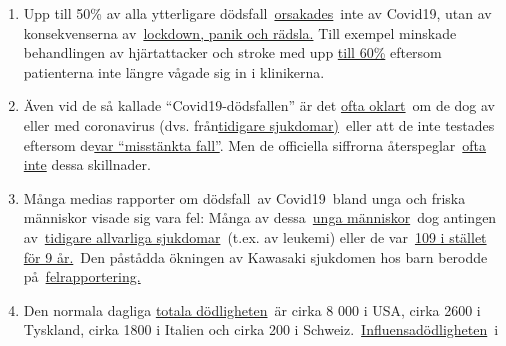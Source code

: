 \begin{enumerate}
{  klart}~om dessa människor verkligen dog från Covid19 eller av höga
  nivåer av stress, rädsla
  och~\href{http://pflegeethik-initiative.de/2020/04/15/corona-krise-falsche-prioritaeten-gesetzt-und-ethische-prinzipien-verletzt/}{ensamhet.}
\item
  Upp till 50\% av alla ytterligare
  dödsfall~\href{https://www.thetimes.co.uk/edition/news/coronavirus-record-weekly-death-toll-as-fearful-patients-avoid-hospitals-bm73s2tw3}{orsakades}~inte
  av Covid19, utan av konsekvenserna
  av~\href{https://www.telegraph.co.uk/global-health/science-and-disease/two-new-waves-deaths-break-nhs-new-analysis-warns/}{lockdown,
  panik och rädsla.} Till exempel minskade behandlingen av hjärtattacker
  och stroke med upp
  \href{https://www.nytimes.com/2020/04/06/well/live/coronavirus-doctors-hospitals-emergency-care-heart-attack-stroke.html}{till
  60\%} eftersom patienterna inte längre vågade sig in i klinikerna.
\item
  Även vid de så kallade ``Covid19-dödsfallen'' är det
  \href{https://spectator.us/understand-report-figures-covid-deaths/}{ofta
  oklart}~om de dog av eller med coronavirus (dvs.
  från\href{https://www.morgenpost.de/vermischtes/article228994571/Rechtsmediziner-Alle-Corona-Toten-hatten-Vorerkrankungen.html}{tidigare
  sjukdomar)}~eller att de inte testades eftersom
  de\href{https://www.youtube.com/watch?v=V0lIWZpiRU0}{var ``misstänkta
  fall''}. Men de officiella siffrorna
  återspeglar~\href{https://swprs.org/rki-relativiert-corona-todesfaelle/}{ofta
  inte} dessa skillnader.
\item
  Många medias rapporter om dödsfall~av Covid19~bland unga och friska
  människor visade sig vara fel: Många av
  dessa~\href{https://www.dailymail.co.uk/news/article-8193487/Coroner-refuses-rule-COVID-19-cause-death-six-week-old-Connecticut-baby.html}{unga
  människor}~dog antingen
  av~\href{https://www.msn.com/de-ch/news/other/spanischer-nachwuchs-trainer-stirbt-an-corona/ar-BB11gT64}{tidigare
  allvarliga sjukdomar}~(t.ex. av leukemi) eller de
  var~\href{https://www.n-tv.de/panorama/Neunjaehrige-Corona-Tote-war-109-Jahre-alt-article21753784.html}{109
  i stället för 9 år.}~Den påstådda ökningen av Kawasaki sjukdomen hos
  barn berodde
  på~\href{https://www.societi.org.uk/kawasaki-disease-and-covid-19/}{felrapportering.}
\item
  Den normala dagliga
  \href{https://www.cdc.gov/mmwr/volumes/68/wr/mm6826a5.htm}{totala
  dödligheten}~är cirka 8 000 i USA, cirka 2600 i Tyskland, cirka 1800 i
  Italien och cirka 200 i
  Schweiz.~\href{https://www.statnews.com/2018/09/26/cdc-us-flu-deaths-winter/}{Influensadödligheten}~i

\end{enumerate}
